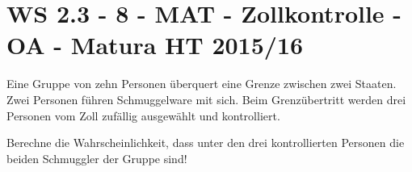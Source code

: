 \section{WS 2.3 - 8 - MAT - Zollkontrolle - OA - Matura HT 2015/16}

\begin{beispiel}[WS 2.3]{1} %
Eine Gruppe von zehn Personen überquert eine Grenze zwischen zwei Staaten. Zwei Personen
führen Schmuggelware mit sich. Beim Grenzübertritt werden drei Personen vom Zoll zufällig ausgewählt und kontrolliert. \leer

Berechne die Wahrscheinlichkeit, dass unter den drei kontrollierten Personen die beiden
Schmuggler der Gruppe sind!

\end{beispiel}